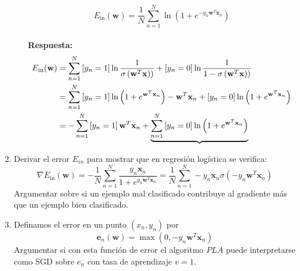 \documentclass[12pt,a4paper]{article}
\begin{document}
\begin{enumerate}
\begin{enumerate}
		$$E_{\mathrm{in}}(\mathbf{w})=\frac{1}{N} \sum_{n=1}^{N} \ln \left(1+e^{-y_{n} \mathbf{w}^{T} \mathbf{x}_{n}}\right)$$\\
		\textbf{Respuesta: }\\
						\begin{equation}
		\begin{aligned}
		\begin{split}
		\notag
		E_{\mathrm{in}}(\mathbf{w}) &=\sum_{n=1}^{N}\left[y_{n}=1\right] \ln \frac{1}{\sigma\left(\mathbf{w}^{T} \mathbf{x}\right))}+\left[y_{n}=0\right] \ln \frac{1}{1-\sigma\left(\mathbf{w}^{T} \mathbf{x}\right))}\\ &=
		\sum_{n=1}^{N}\left[y_{n}=1\right] \ln \left(1+e^{\mathbf{w}^{T} \mathbf{x}_{n}}\right)-\mathbf{w}^{T} \mathbf{x}_{n}+\left[y_{n}=0\right] \ln \left(1+e^{\mathbf{w}^{T} \mathbf{x}_{n}}\right)\\ &=
-\sum_{n=1}^{N}\left[y_{n}=1\right]\mathbf{w}^{T} \mathbf{x}_{n}+   \underbrace{\sum_{n=1}^{N}\left[y_{n}=0\right] \ln \left(1+e^{\mathbf{w}^{T} \mathbf{x}_{n}}\right)}
		\end{split}
		\end{aligned}
		\end{equation}
	\end{enumerate}
\item Derivar el error $E_{in}$ para mostrar que en regresión logística se verifica: $$\nabla E_{\mathrm{in}}(\mathbf{w})=-\frac{1}{N} \sum_{n=1}^{N} \frac{y_{n} \mathbf{x}_{n}}{1+e^{y_{n} \mathbf{w}^{T} \mathbf{x}_{n}}}=\frac{1}{N} \sum_{n=1}^{N}-y_{n} \mathbf{x}_{n} \sigma\left(-y_{n} \mathbf{w}^{T} \mathbf{x}_{n}\right)$$
Argumentar sobre si un ejemplo mal clasificado contribuye al gradiente más que un ejemplo bien clasificado.
\item Definamos el error en un punto $(x_n,y_n)$ por $$\mathbf{e}_{n}(\mathbf{w})=\max \left(0,-y_{n} \mathbf{w}^{T} \mathbf{x}_{n}\right)$$ Argumentar si con esta función de error el algoritmo $PLA$ puede interpretarse como SGD sobre $e_n$ con tasa de aprendizaje $v=1$.
\end{enumerate}
\end{document}
